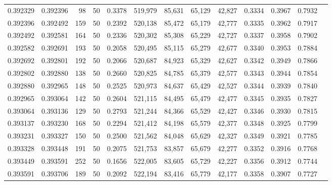 \begin{tabular}{rrrrrrrrrrrrr}
0.392329 & 0.392396 &    98 &  50 &                                     0.3378 & 519,979 &  85,631 &  65,129 &  42,827 & 0.3334 & 0.3967 & 0.7932 \\
0.392396 & 0.392492 &   159 &  50 &                                     0.2392 & 520,138 &  85,472 &  65,179 &  42,777 & 0.3335 & 0.3962 & 0.7917 \\
0.392492 & 0.392581 &   164 &  50 &                                     0.2336 & 520,302 &  85,308 &  65,229 &  42,727 & 0.3337 & 0.3958 & 0.7902 \\
0.392582 & 0.392691 &   193 &  50 &                                     0.2058 & 520,495 &  85,115 &  65,279 &  42,677 & 0.3340 & 0.3953 & 0.7884 \\
0.392692 & 0.392801 &   192 &  50 &                                     0.2066 & 520,687 &  84,923 &  65,329 &  42,627 & 0.3342 & 0.3949 & 0.7866 \\
0.392802 & 0.392880 &   138 &  50 &                                     0.2660 & 520,825 &  84,785 &  65,379 &  42,577 & 0.3343 & 0.3944 & 0.7854 \\
0.392880 & 0.392965 &   148 &  50 &                                     0.2525 & 520,973 &  84,637 &  65,429 &  42,527 & 0.3344 & 0.3939 & 0.7840 \\
0.392965 & 0.393064 &   142 &  50 &                                     0.2604 & 521,115 &  84,495 &  65,479 &  42,477 & 0.3345 & 0.3935 & 0.7827 \\
0.393064 & 0.393136 &   129 &  50 &                                     0.2793 & 521,244 &  84,366 &  65,529 &  42,427 & 0.3346 & 0.3930 & 0.7815 \\
0.393137 & 0.393230 &   168 &  50 &                                     0.2294 & 521,412 &  84,198 &  65,579 &  42,377 & 0.3348 & 0.3925 & 0.7799 \\
0.393231 & 0.393327 &   150 &  50 &                                     0.2500 & 521,562 &  84,048 &  65,629 &  42,327 & 0.3349 & 0.3921 & 0.7785 \\
0.393328 & 0.393448 &   191 &  50 &                                     0.2075 & 521,753 &  83,857 &  65,679 &  42,277 & 0.3352 & 0.3916 & 0.7768 \\
0.393449 & 0.393591 &   252 &  50 &                                     0.1656 & 522,005 &  83,605 &  65,729 &  42,227 & 0.3356 & 0.3912 & 0.7744 \\
0.393591 & 0.393706 &   189 &  50 &                                     0.2092 & 522,194 &  83,416 &  65,779 &  42,177 & 0.3358 & 0.3907 & 0.7727 \\

\end{tabular}
